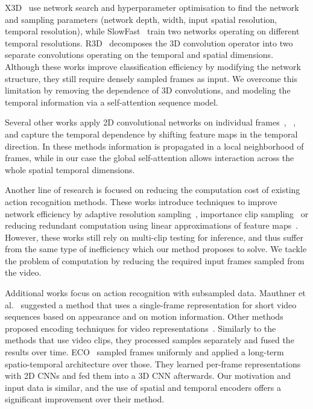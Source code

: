 \documentclass[10pt,twocolumn,letterpaper]{article}
\begin{document}
X3D~\cite{feichtenhofer2020x3d} use network search and hyperparameter optimisation to find the network and sampling parameters (network depth, width, input spatial resolution, temporal resolution), while SlowFast~\cite{feichtenhofer2019slowfast} train two networks operating on different temporal resolutions. R3D~\cite{tran2018closer} decomposes the 3D convolution operator into two separate convolutions operating on the temporal and spatial dimensions. Although these works improve classification efficiency by modifying the network structure, they still require densely sampled frames as input. We overcome this limitation by removing the dependence of 3D convolutions, and modeling the temporal information via a self-attention sequence model. 

Several other works apply 2D convolutional networks on individual frames~\cite{lin2019tsm}, ~\cite{fan2019more}, and capture the temporal dependence by shifting feature maps in the temporal direction. In these methods information is propagated in a local neighborhood of frames, while in our case the global self-attention allows interaction across the whole spatial temporal dimensions. 







Another line of research is focused on reducing the computation cost of existing action recognition methods. These works introduce techniques to improve network efficiency by adaptive resolution sampling~\cite{meng2020ar}, importance clip sampling~\cite{korbar2019scsampler} or reducing redundant computation using linear approximations of feature maps~\cite{pan2021va}. However, these works still rely on multi-clip testing for inference, and thus suffer from the same type of inefficiency which our method proposes to solve.  We tackle the problem of computation by reducing the required input frames sampled from the video. 


Additional works focus on action recognition with subsampled data. Mauthner et al.~\cite{mauthner2009action} suggested a method that uses a single-frame representation for short video sequences based on appearance and on motion information.
Other methods proposed encoding techniques for video representations~\cite{qiu2017deep,yue2015beyond}. Similarly to the methods that use video clips, they processed samples separately and fused the results over time.  
ECO~\cite{zolfaghari2018eco} sampled frames uniformly and applied a long-term spatio-temporal architecture over those. They learned per-frame representations with 2D CNNs and fed them into a 3D CNN afterwards. Our motivation and input data is similar, and the use of spatial and temporal encoders offers a significant improvement over their method. 
\end{document}
